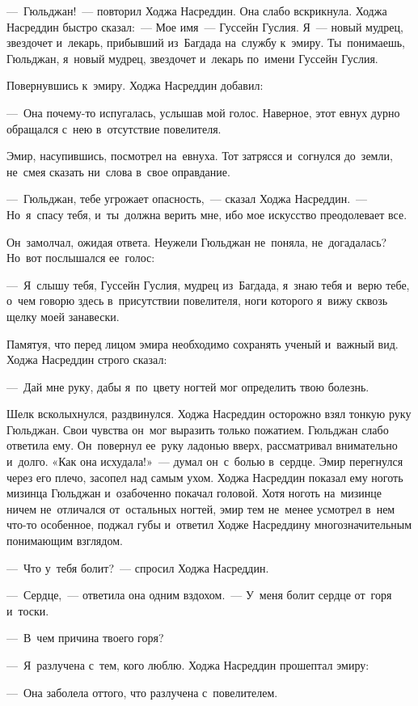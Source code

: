 \documentclass[12pt,a4paper]{book}
\begin{document}
—~Гюльджан!~— повторил Ходжа Насреддин. Она слабо вскрикнула. Ходжа Насреддин быстро сказал:~— Мое имя~— Гуссейн Гуслия. Я~— новый мудрец, звездочет и~лекарь, прибывший из~Багдада на~службу к~эмиру. Ты~понимаешь, Гюльджан, я~новый мудрец, звездочет и~лекарь по~имени Гуссейн Гуслия.

Повернувшись к~эмиру. Ходжа Насреддин добавил:

—~Она почему-то испугалась, услышав мой голос. Наверное, этот евнух дурно обращался с~нею в~отсутствие повелителя.

Эмир, насупившись, посмотрел на~евнуха. Тот затрясся и~согнулся до~земли, не~смея сказать ни~слова в~свое оправдание.

—~Гюльджан, тебе угрожает опасность,~— сказал Ходжа Насреддин.~— Но~я~спасу тебя, и~ты~должна верить мне, ибо мое искусство преодолевает все.

Он~замолчал, ожидая ответа. Неужели Гюльджан не~поняла, не~догадалась? Но~вот послышался ее~голос:

—~Я~слышу тебя, Гуссейн Гуслия, мудрец из~Багдада, я~знаю тебя и~верю тебе, о~чем говорю здесь в~присутствии повелителя, ноги которого я~вижу сквозь щелку моей занавески.

Памятуя, что перед лицом эмира необходимо сохранять ученый и~важный вид. Ходжа Насреддин строго сказал:

—~Дай мне руку, дабы я~по~цвету ногтей мог определить твою болезнь.

Шелк всколыхнулся, раздвинулся. Ходжа Насреддин осторожно взял тонкую руку Гюльджан. Свои чувства он~мог выразить только пожатием. Гюльджан слабо ответила ему. Он~повернул ее~руку ладонью вверх, рассматривал внимательно и~долго. «Как она исхудала!»~— думал он~с~болью в~сердце. Эмир перегнулся через его плечо, засопел над самым ухом. Ходжа Насреддин показал ему ноготь мизинца Гюльджан и~озабоченно покачал головой. Хотя ноготь на~мизинце ничем не~отличался от~остальных ногтей, эмир тем не~менее усмотрел в~нем что-то особенное, поджал губы и~ответил Ходже Насреддину многозначительным понимающим взглядом.

—~Что у~тебя болит?~— спросил Ходжа Насреддин.

—~Сердце,~— ответила она одним вздохом.~— У~меня болит сердце от~горя и~тоски.

—~В~чем причина твоего горя?

—~Я~разлучена с~тем, кого люблю. Ходжа Насреддин прошептал эмиру:

—~Она заболела оттого, что разлучена с~повелителем.
\end{document}
